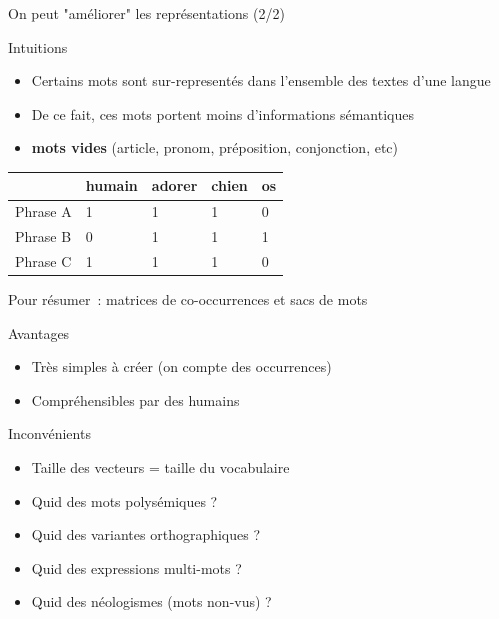 \documentclass[serif, aspectratio=169]{beamer}
\begin{document}
\begin{frame}{On peut "améliorer" les représentations (2/2)}
    \begin{block}{Intuitions}
       \begin{itemize}
            \item Certains mots sont sur-representés dans l'ensemble des textes d'une langue
            \item De ce fait, ces mots portent moins d'informations sémantiques 
            \item[$\Rightarrow$] \textbf{mots vides} (article, pronom, préposition, conjonction, etc)
        \end{itemize} 
    \end{block}
    \vfill
    \pause
    \begin{table}
        \begin{tabular}{lp{1.2cm}p{1.2cm}p{1.2cm}l}
                     & humain & adorer & chien & os \\
            \hline
            \hline
            Phrase A & 1      & 1      & 1     & 0  \\
            Phrase B & 0      & 1      & 1     & 1  \\
            Phrase C & 1      & 1      & 1     & 0  \\
        \end{tabular}
    \end{table}
\end{frame}

\begin{frame}{Pour résumer~: matrices de co-occurrences et sacs de mots}
    \begin{block}{Avantages}
        \begin{itemize}
            \item Très simples à créer (on compte des occurrences)
            \item Compréhensibles par des humains
        \end{itemize}
    \end{block}
    \vfill
    \begin{block}{Inconvénients}
        \begin{itemize}
            \item Taille des vecteurs = taille du vocabulaire
            \item Quid des mots polysémiques ?
            \item Quid des variantes orthographiques ?
            \item Quid des expressions multi-mots ?
            \item Quid des néologismes (mots non-vus) ?
        \end{itemize}
    \end{block}
\end{frame}
\end{document}
